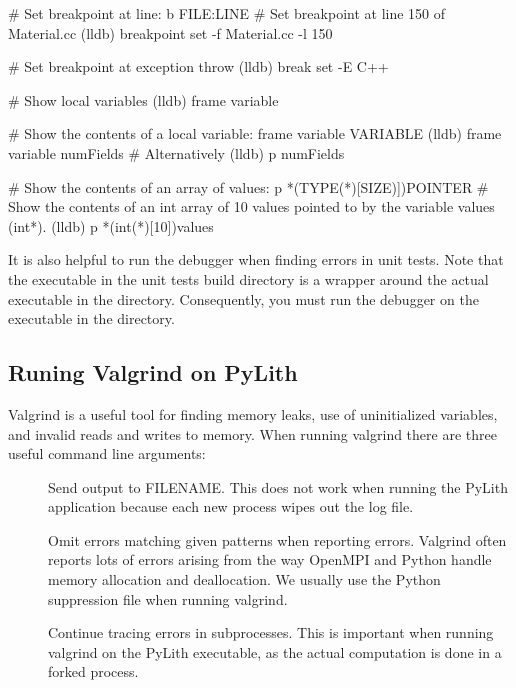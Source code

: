 \begin{shell}
# Set breakpoint at line: b FILE:LINE
# Set breakpoint at line 150 of Material.cc
(lldb) breakpoint set -f Material.cc -l 150

# Set breakpoint at exception throw
(lldb) break set -E C++

# Show local variables
(lldb) frame variable

# Show the contents of a local variable: frame variable VARIABLE
(lldb) frame variable numFields
# Alternatively
(lldb) p numFields

# Show the contents of an array of values: p *(TYPE(*)[SIZE)])POINTER
# Show the contents of an int array of 10 values pointed to by the variable values (int*).
(lldb) p *(int(*)[10])values
\end{shell}

It is also helpful to run the debugger when finding errors in unit tests. Note that the executable in the unit tests
build directory is a wrapper around the actual executable in the  directory. Consequently, you must run
the debugger on the executable in the  directory.




\subsection{Runing Valgrind on PyLith}

Valgrind is a useful tool for finding memory leaks, use of uninitialized variables, and invalid reads and writes to
memory. When running valgrind there are three useful command line arguments:
\begin{description}
\item[] Send output to FILENAME. This does not work when running the PyLith
application because each new process wipes out the log file.
\item[] Omit errors matching given patterns when reporting errors. Valgrind often
reports lots of errors arising from the way OpenMPI and Python handle memory allocation and deallocation. We usually use
the Python suppression file  when running valgrind.
\item[] Continue tracing errors in subprocesses. This is important when running valgrind
on the PyLith executable, as the actual computation is done in a forked process.
\end{description}

